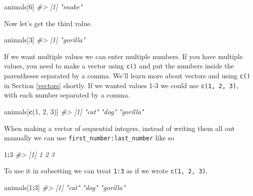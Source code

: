 \documentclass[
  12pt,
]{book}
\newenvironment{Shaded}{\begin{snugshade}}{\end{snugshade}}
\newcommand{\CommentTok}[1]{\textcolor[rgb]{0.56,0.35,0.01}{\textit{#1}}}
\newcommand{\DecValTok}[1]{\textcolor[rgb]{0.00,0.00,0.81}{#1}}
\newcommand{\KeywordTok}[1]{\textcolor[rgb]{0.13,0.29,0.53}{\textbf{#1}}}
\newcommand{\NormalTok}[1]{#1}
\newcommand{\OperatorTok}[1]{\textcolor[rgb]{0.81,0.36,0.00}{\textbf{#1}}}
\begin{document}
\begin{Shaded}
\begin{Highlighting}[]
\NormalTok{animals[}\DecValTok{6}\NormalTok{]}
\CommentTok{\#> [1] "snake"}
\end{Highlighting}
\end{Shaded}

Now let's get the third value.

\begin{Shaded}
\begin{Highlighting}[]
\NormalTok{animals[}\DecValTok{3}\NormalTok{]}
\CommentTok{\#> [1] "gorilla"}
\end{Highlighting}
\end{Shaded}

If we want multiple values we can enter multiple numbers. If you have multiple values, you need to make a vector using \texttt{c()} and put the numbers inside the parentheses separated by a comma. We'll learn more about vectors and using \texttt{c()} in Section \ref{vectors} shortly. If we wanted values 1-3 we could use \texttt{c(1,\ 2,\ 3)}, with each number separated by a comma.

\begin{Shaded}
\begin{Highlighting}[]
\NormalTok{animals[}\KeywordTok{c}\NormalTok{(}\DecValTok{1}\NormalTok{, }\DecValTok{2}\NormalTok{, }\DecValTok{3}\NormalTok{)]}
\CommentTok{\#> [1] "cat"     "dog"     "gorilla"}
\end{Highlighting}
\end{Shaded}

When making a vector of sequential integers, instead of writing them all out manually we can use \texttt{first\_number:last\_number} like so

\begin{Shaded}
\begin{Highlighting}[]
\DecValTok{1}\OperatorTok{:}\DecValTok{3}
\CommentTok{\#> [1] 1 2 3}
\end{Highlighting}
\end{Shaded}

To use it in subsetting we can treat \texttt{1:3} as if we wrote \texttt{c(1,\ 2,\ 3)}.

\begin{Shaded}
\begin{Highlighting}[]
\NormalTok{animals[}\DecValTok{1}\OperatorTok{:}\DecValTok{3}\NormalTok{]}
\CommentTok{\#> [1] "cat"     "dog"     "gorilla"}
\end{Highlighting}
\end{Shaded}
\end{document}
